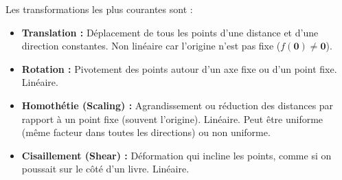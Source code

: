 \documentclass{article}
\begin{document}
Les transformations les plus courantes sont :

\begin{itemize}
    \item \textbf{Translation :} Déplacement de tous les points d'une distance et d'une direction constantes. Non linéaire car l'origine n'est pas fixe ($f(\mathbf{0}) \neq \mathbf{0}$).
    \item \textbf{Rotation :} Pivotement des points autour d'un axe fixe ou d'un point fixe. Linéaire.
    \item \textbf{Homothétie (Scaling) :} Agrandissement ou réduction des distances par rapport à un point fixe (souvent l'origine). Linéaire. Peut être uniforme (même facteur dans toutes les directions) ou non uniforme.
    \item \textbf{Cisaillement (Shear) :} Déformation qui incline les points, comme si on poussait sur le côté d'un livre. Linéaire.
\end{itemize}
\end{document}
